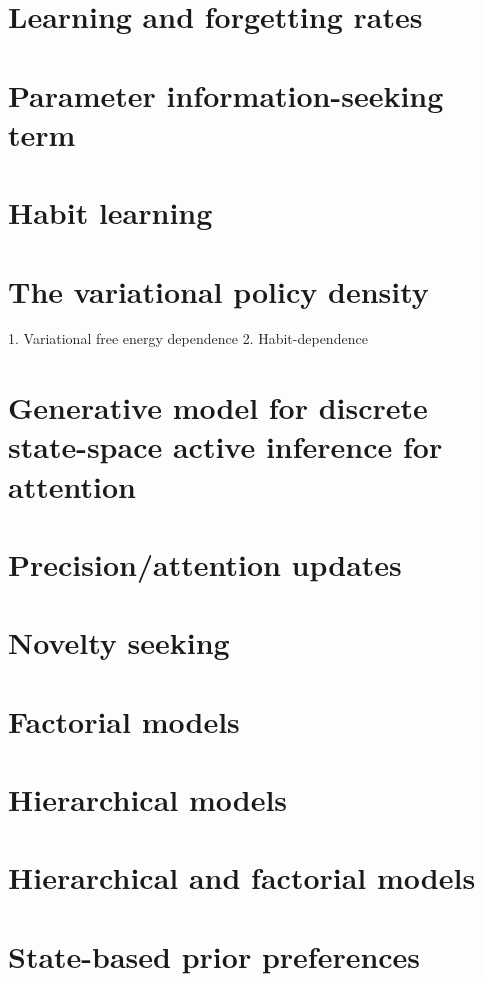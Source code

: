 \section{Learning and forgetting rates}
\section{Parameter information-seeking term}
\section{Habit learning}
\section{The variational policy density}
    1. Variational free energy dependence
    2. Habit-dependence
\section{Generative model for discrete state-space active inference for attention}
\section{Precision/attention updates}
\section{Novelty seeking}
\section{Factorial models}
\section{Hierarchical models}
\section{Hierarchical and factorial models}
\section{State-based prior preferences}